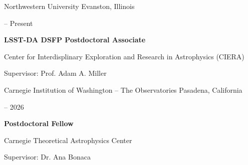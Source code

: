 \documentclass[cv.tex]{subfiles}
\begin{document}

\vspace{-5mm}
\noindent
{\color{themecolor} \large
Northwestern University
}
\hfill
Evanston, Illinois
\par\noindent
\parbox{0.18\textwidth}{%
	\vspace{-1mm}
	 -- Present \par
	\null \par
	\null \par
}
\hspace{1mm}
\parbox{0.8\textwidth}{%
	\textbf{LSST-DA DSFP Postdoctoral Associate} \par
	Center for Interdisplinary Exploration and Research in Astrophysics (CIERA)
	\par
	Supervisor: Prof. Adam A. Miller \par
}

\vspace{3mm}
\noindent
{\color{themecolor} \large
Carnegie Institution of Washington -- The Observatories
}
\hfill
Pasadena, California
\par\noindent
\parbox{0.18\textwidth}{%
	 -- 2026 \par
	\null \par
	\null \par
}
\hspace{1mm}
\parbox{0.8\textwidth}{%
	\textbf{Postdoctoral Fellow} \par
	Carnegie Theoretical Astrophysics Center \par
	Supervisor: Dr. Ana Bonaca \par
}
\end{document}
